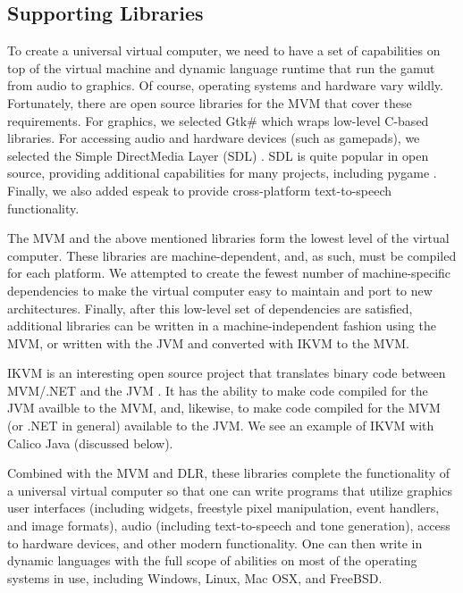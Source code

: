\documentclass[preprint]{sigplanconf}
\begin{document}

\subsection{Supporting Libraries}

To create a universal virtual computer, we need to have a set of
capabilities on top of the virtual machine and dynamic language
runtime that run the gamut from audio to graphics. Of course,
operating systems and hardware vary wildly. Fortunately, there are
open source libraries for the MVM that cover these requirements. For
graphics, we selected Gtk\# \cite{gtk-sharp} which wraps low-level
C-based libraries. For accessing audio and hardware devices (such as
gamepads), we selected the Simple DirectMedia Layer (SDL)
\cite{sdl}. SDL is quite popular in open source, providing additional
capabilities for many projects, including pygame
\cite{pygame}. Finally, we also added espeak \cite{espeak} to provide
cross-platform text-to-speech functionality.


The MVM and the above mentioned libraries form the lowest level of the
virtual computer. These libraries are machine-dependent, and, as such,
must be compiled for each platform. We attempted to create the fewest
number of machine-specific dependencies to make the virtual computer
easy to maintain and port to new architectures.  Finally, after this
low-level set of dependencies are satisfied, additional libraries can
be written in a machine-independent fashion using the MVM, or written
with the JVM and converted with IKVM to the MVM.

IKVM is an interesting open source project that translates binary code
between MVM/.NET and the JVM \cite{ikvm}. It has the ability to make
code compiled for the JVM availble to the MVM, and, likewise, to make
code compiled for the MVM (or .NET in general) available to the
JVM. We see an example of IKVM with Calico Java (discussed below).

Combined with the MVM and DLR, these libraries complete the
functionality of a universal virtual computer so that one can write
programs that utilize graphics user interfaces (including widgets,
freestyle pixel manipulation, event handlers, and image formats),
audio (including text-to-speech and tone generation), access to
hardware devices, and other modern functionality. One can then write
in dynamic languages with the full scope of abilities on most of the
operating systems in use, including Windows, Linux, Mac OSX, and
FreeBSD.
\end{document}
